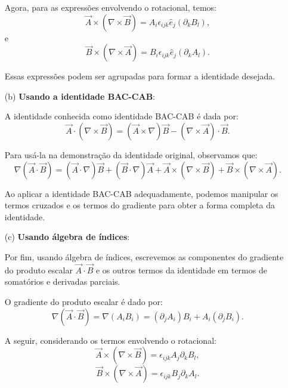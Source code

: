 \documentclass[a4paper,12pt]{article}
\begin{document}
\begin{flushleft}
\begin{itemize}
        Agora, para as expressões envolvendo o rotacional, temos:
        \begin{equation}
        \vec{A} \times (\nabla \times \vec{B}) = A_i \epsilon_{ijk} \hat{e}_j (\partial_k B_l),
        \end{equation}
        e
        \begin{equation}
        \vec{B} \times (\nabla \times \vec{A}) = B_i \epsilon_{ijk} \hat{e}_j (\partial_k A_l).
        \end{equation}
        
        Essas expressões podem ser agrupadas para formar a identidade desejada.
        
        \item[(b)] \textbf{Usando a identidade BAC-CAB}:
        
        A identidade conhecida como identidade BAC-CAB é dada por:
        \begin{equation}
        \vec{A} \cdot (\nabla \times \vec{B}) = (\vec{A} \times \nabla) \vec{B} - (\nabla \times \vec{A}) \cdot \vec{B}.
        \end{equation}
        
        Para usá-la na demonstração da identidade original, observamos que:
        \begin{equation}
        \nabla (\vec{A} \cdot \vec{B}) = (\vec{A} \cdot \nabla) \vec{B} + (\vec{B} \cdot \nabla) \vec{A} + \vec{A} \times (\nabla \times \vec{B}) + \vec{B} \times (\nabla \times \vec{A}).
        \end{equation}
        
        Ao aplicar a identidade BAC-CAB adequadamente, podemos manipular os termos cruzados e os termos do gradiente para obter a forma completa da identidade.
        
        \item[(c)] \textbf{Usando álgebra de índices}:
        
        Por fim, usando álgebra de índices, escrevemos as componentes do gradiente do produto escalar \( \vec{A} \cdot \vec{B} \) e os outros termos da identidade em termos de somatórios e derivadas parciais.
        
        O gradiente do produto escalar é dado por:
        \begin{equation}
        \nabla (\vec{A} \cdot \vec{B}) = \nabla (A_i B_i) = (\partial_j A_i) B_i + A_i (\partial_j B_i).
        \end{equation}
        
        A seguir, considerando os termos envolvendo o rotacional:
        \begin{equation}
        \vec{A} \times (\nabla \times \vec{B}) = \epsilon_{ijk} A_j \partial_k B_l,
        \end{equation}
        \begin{equation}
        \vec{B} \times (\nabla \times \vec{A}) = \epsilon_{ijk} B_j \partial_k A_l.
        \end{equation}
        

\end{itemize}
\end{flushleft}
\end{document}
